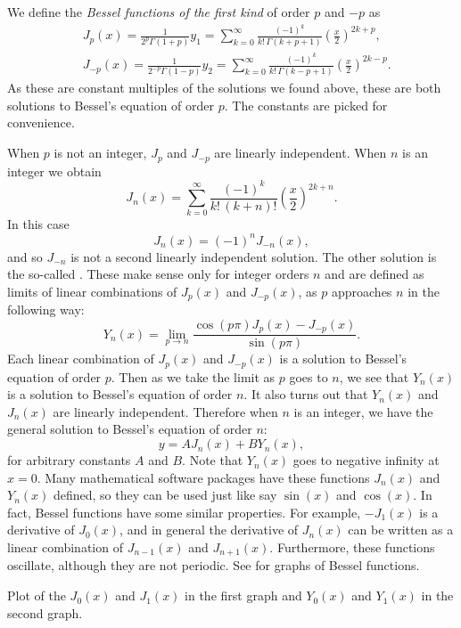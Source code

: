 \documentclass{ximera}
\begin{document}
We define the \emph{Bessel functions of the first kind}%
 of order $p$ and $-p$ as
\begin{align*}
    & J_p(x) = \frac{1}{2^p\Gamma(1+p)} y_1 = \sum_{k=0}^\infty \frac{{(-1)}^k}{k! \, \Gamma(k+p+1)} {\left(\frac{x}{2}\right)}^{2k+p} , \\
    & J_{-p}(x) = \frac{1}{2^{-p}\Gamma(1-p)} y_2 = \sum_{k=0}^\infty \frac{{(-1)}^k}{k! \,\Gamma(k-p+1)} {\left(\frac{x}{2}\right)}^{2k-p} .
\end{align*}
As these are constant multiples of the solutions we found above, these are both solutions to Bessel's equation of order $p$.  The constants are picked for convenience.

When $p$ is not an integer, $J_p$ and $J_{-p}$ are linearly independent.  When $n$ is an integer we  obtain
\begin{equation*}
    J_n(x) = \sum_{k=0}^\infty \frac{{(-1)}^k}{k! \,(k+n)!} {\left(\frac{x}{2}\right)}^{2k+n} .
\end{equation*}
In this case
\begin{equation*}
    J_n(x) = {(-1)}^nJ_{-n}(x) ,
\end{equation*}
and so $J_{-n}$ is not a second linearly independent solution.  The other solution is the so-called \emph{}.  These make sense only for integer orders $n$ and are defined as limits of linear combinations of $J_p(x)$ and $J_{-p}(x)$, as $p$ approaches $n$ in the following way:
\begin{equation*}
    Y_n(x) = \lim_{p\to n} \frac{\cos(p \pi) J_p(x) - J_{-p}(x)}{\sin(p \pi)} .
\end{equation*}
Each linear combination of $J_p(x)$ and $J_{-p}(x)$ is a solution to Bessel's equation of order $p$.  Then as we take the limit as $p$ goes to $n$, we see that $Y_n(x)$ is a solution to Bessel's equation of order $n$.  It also turns out that $Y_n(x)$ and $J_n(x)$ are linearly independent.  Therefore when $n$ is an integer, we have the general solution to Bessel's equation of order $n$:
\begin{equation*}
    y = A J_n(x) + B Y_n(x) ,
\end{equation*}
for arbitrary constants $A$ and $B$.  Note that $Y_n(x)$ goes to negative infinity at $x=0$.   Many mathematical software packages have these functions $J_n(x)$ and $Y_n(x)$ defined, so they can be used just like say $\sin(x)$ and $\cos(x)$.  In fact, Bessel functions have some similar properties.  For example, $-J_1(x)$ is a derivative of $J_0(x)$, and in general the derivative of $J_n(x)$ can be written as a linear combination of $J_{n-1}(x)$ and $J_{n+1}(x)$.  Furthermore, these functions oscillate, although they are not periodic.  See  for graphs of Bessel functions.
\begin{myfig}
    \capstart
    \caption{Plot of the $J_0(x)$ and $J_1(x)$ in the first graph and $Y_0(x)$ and $Y_1(x)$ in the second graph.\label{bessel:graphsfig}}
\end{myfig}
\end{document}
